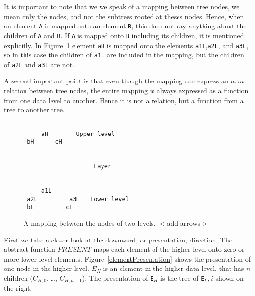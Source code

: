 It is important to note that we we speak of a mapping between tree nodes, we mean only the nodes, and not the subtrees rooted at theses nodes. Hence, when an element \verb|A| is mapped onto an element \verb|B|, this does not say anything about the children of \verb|A| and \verb|B|. If \verb|A| is mapped onto \verb|B| including its children, it is mentioned explicitly. In Figure~\ref{nodeMapping} element \verb|aH| is mapped onto the elements \verb|a1L|,\verb|a2L|, and \verb|a3L|, so in this case the children of \verb|a1L| are included in the mapping, but the children of \verb|a2L| and \verb|a3L| are not. 

A second important point is that even though the mapping can express an $n:m$ relation between tree nodes, the entire mapping is always expressed as a function from one data level to another. Hence it is not a relation, but a function from a tree to another tree.


\begin{figure}
\begin{center}
\begin{center}
\begin{verbatim}

     aH        Upper level
 bH      cH
 

                    Layer

 
     a1L 
 a2L         a3L   Lower level
 bL         cL
\end{verbatim}
\end{center}
\caption{A mapping between the nodes of two levels. $<$add arrows$>$}\label{nodeMapping} 
\end{center}
\end{figure}



First we take a closer look at the downward, or presentation, direction. The abstract function $PRESENT$ maps each element of the higher level onto zero or more lower level elements. Figure~\ref{elementPresentation} shows the presentation of one node in the higher level. $E_H$ is an element in the higher data level, that has $n$ children ($C_{H,0}$, \dots, $C_{H,n-1}$). The presentation of \verb|E|$_H$ is the tree of \verb|E|$_L,i$ shown on the right.


